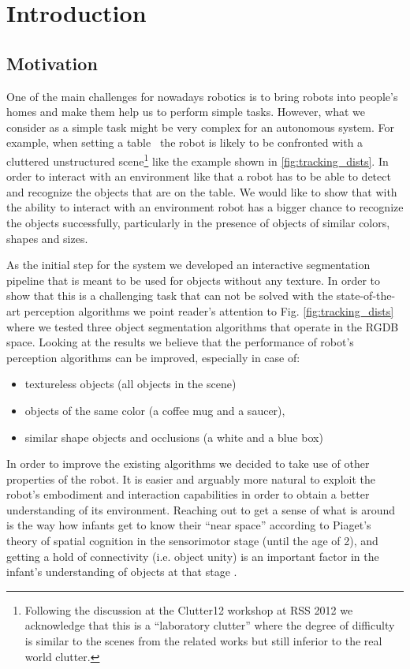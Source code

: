 \chapter{Introduction}
\label{chapter:Introduction}


 
\section{Motivation}
\label{sec:intro}
One of the main challenges for nowadays robotics is to bring robots into people's homes and make them help us to perform simple tasks. However, what we consider as a simple task might be very complex for an autonomous system. For example, when setting a table~\cite{iros10kcopman} the robot is likely to be
confronted with a cluttered unstructured scene\footnote{Following the discussion at the Clutter12
workshop at RSS 2012 we acknowledge that this is a ``laboratory clutter'' where the degree of difficulty
is similar to the scenes from the related works but still inferior to the real world clutter.} like the example shown
in \ref{fig:tracking_dists}. In order to interact with an environment like that a robot has to be able to detect and recognize the objects that are on the table. We would like to show that with the ability to interact with an environment robot has a bigger chance to recognize the objects successfully, particularly in the presence of objects of similar colors, shapes and sizes. 


As the initial step for the system we developed an interactive segmentation pipeline that is meant to be used for objects without any texture. In order to show that this is a challenging task that can not be solved with the state-of-the-art perception algorithms we point reader's attention to Fig. \ref{fig:tracking_dists} where we tested three object segmentation algorithms that operate in the RGDB space. Looking at the results we believe that the performance of robot's perception algorithms can be improved, especially in case of: 

\begin{itemize} 
\item textureless objects (all objects in the scene)
\item objects of the same color (a coffee mug and a saucer), 
\item similar shape objects and occlusions (a white and a blue box) 
\end{itemize}

In order to improve the existing algorithms we decided to take use of other properties of the robot. It is easier and arguably more natural to exploit the robot's embodiment
and interaction capabilities in order to obtain a better understanding of its environment.
Reaching out to get a sense of what is around is the way how infants get to know their
``near space'' according to Piaget's theory of spatial cognition in the sensorimotor stage 
(until the age of 2), and getting a hold of connectivity (i.e. object unity) is an important
factor in the infant's understanding of objects at that stage \cite{infants}.


